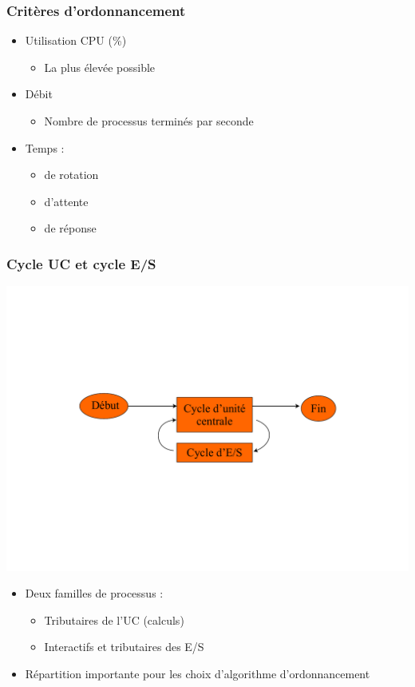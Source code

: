 \begin{frame}
 \frametitle{Critères d’ordonnancement}
 \begin{itemize}
 \item Utilisation CPU (\%)
 \begin{itemize}
 \item La plus élevée possible
 \end{itemize}
 \item Débit 
 \begin{itemize}
 \item Nombre de processus terminés par seconde
 \end{itemize}
 \item Temps :
\begin{itemize}
\item de rotation
\item d’attente
\item de réponse
\end{itemize}

\end{itemize}
\end{frame}

\begin{frame}
 \frametitle{Cycle UC et cycle E/S}
 \includegraphics[width=.9\textwidth]{../illustration/cycle_es_uc.pdf}
 \begin{itemize}
 \item Deux familles de processus :
 \begin{itemize}
 \item Tributaires de l’UC (calculs)
 \item Interactifs et tributaires des E/S
 \end{itemize}
 \item Répartition importante pour les choix d’algorithme d’ordonnancement
 \end{itemize}
\end{frame}



